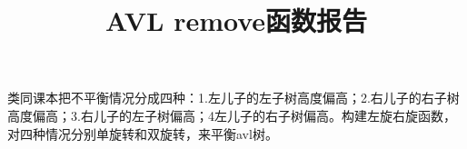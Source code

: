 \documentclass[12pt,a4paper]{Article}%
\title{AVL remove函数报告}
\author{}
\begin{document}
\maketitle
类同课本把不平衡情况分成四种：1.左儿子的左子树高度偏高；2.右儿子的右子树高度偏高；3.右儿子的左子树偏高；4左儿子的右子树偏高。构建左旋右旋函数，对四种情况分别单旋转和双旋转，来平衡avl树。
\end{document}
